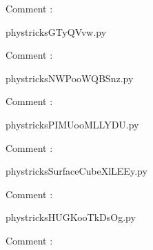     Comment : 

    \clearpage
    


    \newcommand{\CaptionFigGTyQVvw}{<+Type your caption here+>}
    \begin{center}
        
    \end{center}
    phystricksGTyQVvw.py

    Comment : 

    \clearpage
    


    \newcommand{\CaptionFigNWPooWQBSnz}{<+Type your caption here+>}
    \begin{center}
        
    \end{center}
    phystricksNWPooWQBSnz.py

    Comment : 

    \clearpage
    


    \newcommand{\CaptionFigPIMUooMLLYDU}{<+Type your caption here+>}
    \begin{center}
        
    \end{center}
    phystricksPIMUooMLLYDU.py

    Comment : 

    \clearpage
    


    \newcommand{\CaptionFigSurfaceCubeXlLEEy}{<+Type your caption here+>}
    \begin{center}
        
    \end{center}
    phystricksSurfaceCubeXlLEEy.py

    Comment : 

    \clearpage
    


    \newcommand{\CaptionFigHUGKooTkDsOg}{<+Type your caption here+>}
    \begin{center}
        
    \end{center}
    phystricksHUGKooTkDsOg.py

    Comment : 

    \clearpage
    

